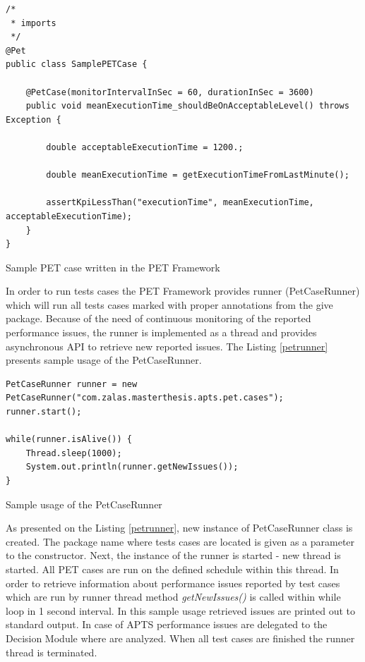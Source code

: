 \documentclass[12pt,a4paper]{article}
\begin{document}
\begin{listing}[ht]\begin{verbatim}
/*
 * imports
 */
@Pet
public class SamplePETCase {

    @PetCase(monitorIntervalInSec = 60, durationInSec = 3600)
    public void meanExecutionTime_shouldBeOnAcceptableLevel() throws Exception {
        
        double acceptableExecutionTime = 1200.;
        
        double meanExecutionTime = getExecutionTimeFromLastMinute();
        
        assertKpiLessThan("executionTime", meanExecutionTime, acceptableExecutionTime);
    }
}
\end{verbatim}
\caption{Sample PET case written in the PET Framework} \label{case}
\end{listing}

In order to run tests cases the PET Framework provides runner (PetCaseRunner) which will run all tests cases marked with proper annotations from the give package. Because of the need of continuous monitoring of the reported performance issues, the runner is implemented as a thread and provides asynchronous API to retrieve new reported issues. The Listing \ref{petrunner} presents sample usage of the PetCaseRunner. 

\begin{listing}[ht]\begin{verbatim}
PetCaseRunner runner = new PetCaseRunner("com.zalas.masterthesis.apts.pet.cases");
runner.start();

while(runner.isAlive()) {
    Thread.sleep(1000);
    System.out.println(runner.getNewIssues());
}
\end{verbatim}
\caption{Sample usage of the PetCaseRunner} \label{petrunner}
\end{listing}

As presented on the Listing \ref{petrunner}, new instance of PetCaseRunner class is created. The package name where tests cases are located is given as a parameter to the constructor. Next, the instance of the runner is started - new thread is started. All PET cases are run on the defined schedule within this thread. In order to retrieve information about performance issues reported by test cases which are run by runner thread method \textit{getNewIssues()} is called within while loop in 1 second interval. In this sample usage retrieved issues are printed out to standard output. In case of APTS performance issues are delegated to the Decision Module where are analyzed. When all test cases are finished the runner thread is terminated.    
\end{document}
